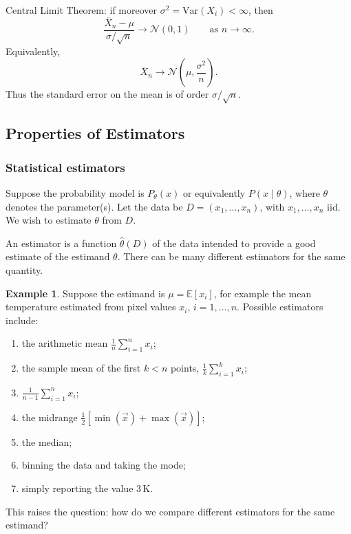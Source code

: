 \documentclass[11pt, titlepage]{article} %
\numberwithin{equation}{section}
\theoremstyle{definition}
\newtheorem*{example*}{Example}
\numberwithin{assumption}{section}
\begin{document}
Central Limit Theorem: if moreover $\sigma^2=\mathrm{Var}(X_i)<\infty$, then
\begin{equation*}
    \frac{\overline{X}_n-\mu}{\sigma/\sqrt{n}}
    \to \mathcal{N}(0,1)
    \qquad \text{as } n\to\infty.
\end{equation*}
Equivalently,
\begin{equation*}
    \overline{X}_n \to \mathcal{N}\!\left(\mu,\frac{\sigma^2}{n}\right).
\end{equation*}
Thus the standard error on the mean is of order $\sigma/\sqrt n$.

\subsection{Properties of Estimators}

\subsubsection*{Statistical estimators}

Suppose the probability model is $P_\theta(x)$ or equivalently $P(x\mid \theta)$, where $\theta$ denotes the parameter(s). Let the data be $D=(x_1,\dots,x_n)$, with $x_1,\dots,x_n$ iid. We wish to estimate $\theta$ from $D$.

An estimator is a function $\hat{\theta}(D)$ of the data intended to provide a good estimate of the estimand $\theta$. There can be many different estimators for the same quantity.

\begin{example*}
Suppose the estimand is $\mu=\mathbb{E}[x_i]$, for example the mean temperature estimated from pixel values $x_i$, $i=1,\dots,n$. Possible estimators include:
\begin{enumerate}
    \item the arithmetic mean $\frac{1}{n}\sum_{i=1}^n x_i$;
    \item the sample mean of the first $k<n$ points, $\frac{1}{k}\sum_{i=1}^k x_i$;
    \item $\frac{1}{n-1}\sum_{i=1}^n x_i$;
    \item the midrange $\frac12[\min(\vec x)+\max(\vec x)]$;
    \item the median;
    \item binning the data and taking the mode;
    \item simply reporting the value $3\,\mathrm{K}$.
\end{enumerate}
This raises the question: how do we compare different estimators for the same estimand?
\end{example*}
\end{document}
